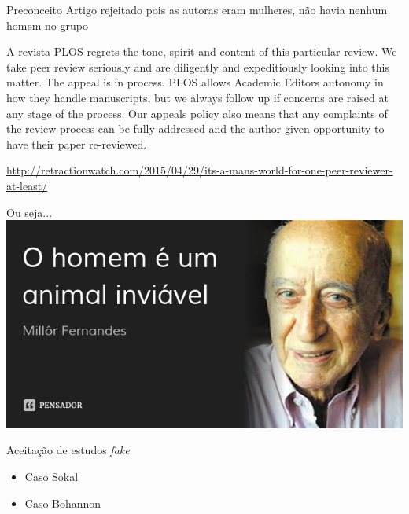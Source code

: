 \documentclass{beamer}
\begin{document}
\begin{frame}{Preconceito}
  Artigo rejeitado pois as autoras eram mulheres, não havia nenhum
  homem no grupo
    \begin{block}{A revista}
      \scriptsize
      PLOS regrets the tone, spirit and content of this particular
      review. We take peer review seriously and are diligently and
      expeditiously looking into this matter. The appeal is in
      process. PLOS allows Academic Editors autonomy in how they
      handle manuscripts, but we always follow up if concerns are
      raised at any stage of the process. Our appeals policy also
      means that any complaints of the review process can be fully
      addressed and the author given opportunity to have their paper
      re-reviewed.
    \end{block}

    \vfill
    \tiny
\url{http://retractionwatch.com/2015/04/29/its-a-mans-world-for-one-peer-reviewer-at-least/}
\end{frame}

\begin{frame}{Ou seja...}
  \includegraphics[width=\textwidth]{Planejamento/millor}
\end{frame}

\begin{frame}{Aceitação de estudos {\em fake}}
  \begin{itemize}
  \item Caso Sokal
    \bigskip
  \item Caso Bohannon
  \end{itemize}
\end{frame}
\end{document}
